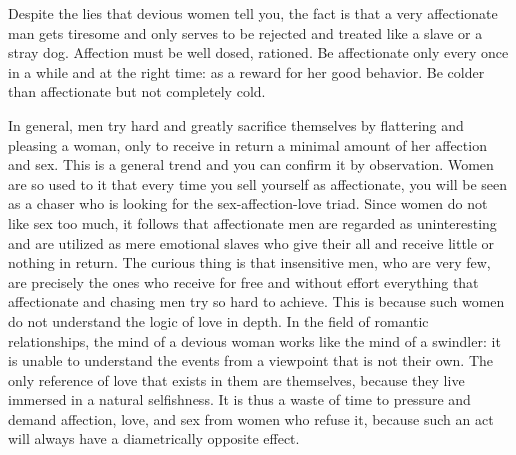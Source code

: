 \par Despite the lies that devious women tell you, the fact is that a very affectionate man gets tiresome and only serves to be rejected and treated like a slave or a stray dog. Affection must be well dosed, rationed. Be affectionate only every once in a while and at the right time: as a reward for her good behavior. Be colder than affectionate but not completely cold.

\par In general, men try hard and greatly sacrifice themselves by flattering and pleasing a woman, only to receive in return a minimal amount of her affection and sex. This is a general trend and you can confirm it by observation. Women are so used to it that every time you sell yourself as affectionate, you will be seen as a chaser who is looking for the sex-affection-love triad. Since women do not like sex too much, it follows that affectionate men are regarded as uninteresting and are utilized as mere emotional slaves who give their all and receive little or nothing in return. The curious thing is that insensitive men, who are very few, are precisely the ones who receive for free and without effort everything that affectionate and chasing men try so hard to achieve. This is because such women do not understand the logic of love in depth. In the field of romantic relationships, the mind of a devious woman works like the mind of a swindler: it is unable to understand the events from a viewpoint that is not their own. The only reference of love that exists in them are themselves, because they live immersed in a natural selfishness. It is thus a waste of time to pressure and demand affection, love, and sex from women who refuse it, because such an act will always have a diametrically opposite effect.

